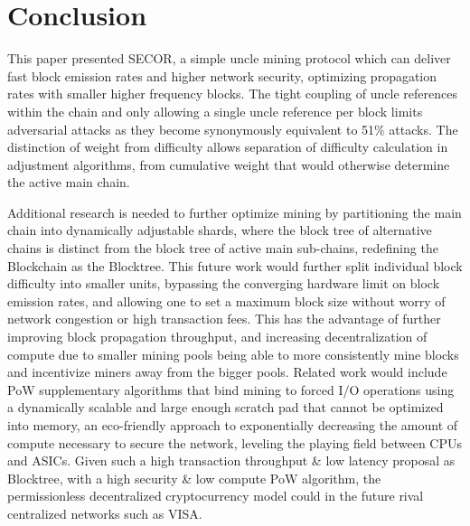 \documentclass{article}
\begin{document}
\section{Conclusion}
This paper presented SECOR, a simple uncle mining protocol which can deliver fast block emission rates and higher network security, optimizing propagation rates with smaller higher frequency blocks. The tight coupling of uncle references within the chain and only allowing a single uncle reference per block limits adversarial attacks as they become synonymously equivalent to 51\% attacks. The distinction of weight from difficulty allows separation of difficulty calculation in adjustment algorithms, from cumulative weight that would otherwise determine the active main chain.

Additional research is needed to further optimize mining by partitioning the main chain into dynamically adjustable shards, where the block tree of alternative chains is distinct from the block tree of active main sub-chains, redefining the Blockchain as the Blocktree. This future work would further split individual block difficulty into smaller units, bypassing the converging hardware limit on block emission rates, and allowing one to set a maximum block size without worry of network congestion or high transaction fees. This has the advantage of further improving block propagation throughput, and increasing decentralization of compute due to smaller mining pools being able to more consistently mine blocks and incentivize miners away from the bigger pools. Related work would include PoW supplementary algorithms that bind mining to forced I/O operations using a dynamically scalable and large enough scratch pad that cannot be optimized into memory, an eco-friendly approach to exponentially decreasing the amount of compute necessary to secure the network, leveling the playing field between CPUs and ASICs. Given such a high transaction throughput \& low latency proposal as Blocktree, with a high security \& low compute PoW algorithm, the permissionless decentralized cryptocurrency model could in the future rival centralized networks such as VISA.
\end{document}
